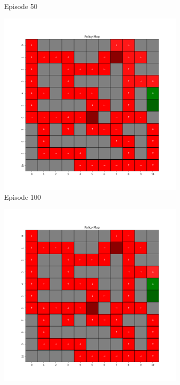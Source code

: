 \documentclass{assignment}
\begin{document}
\begin{figure}[H]
\begin{subfigure}{0.3\textwidth}
    \caption{Episode 50}
    \end{subfigure}\hfill
    \begin{subfigure}{0.3\textwidth}
        \includegraphics[width=\textwidth]{figures/policy_q/gamma_sweep/policy_alpha_0.1_gamma_0.1_epsilon_0.2_iteration_100.png}
    \caption{Episode 100}
    \end{subfigure}
    \begin{subfigure}{0.3\textwidth}
        \includegraphics[width=\textwidth]{figures/policy_q/gamma_sweep/policy_alpha_0.1_gamma_0.1_epsilon_0.2_iteration_1000.png}

\end{subfigure}
\end{figure}
\end{document}
